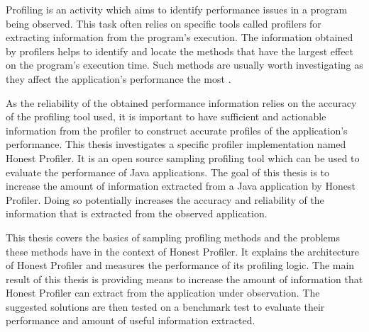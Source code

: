 \documentclass[..thesis.tex]{subfiles}
\begin{document}
Profiling is an activity which aims to identify performance issues in a program being observed. This task often relies on specific tools called profilers for extracting information from the program's execution. The information obtained by profilers helps to identify and locate the methods that have the largest effect on the program's execution time. Such methods are usually worth investigating as they affect the application's performance the most \cite{mytkowicz_evaluating_2010}.


As the reliability of the obtained performance information relies on the accuracy of the profiling tool used, it is important to have sufficient and actionable information from the profiler to construct accurate profiles of the application's performance. This thesis investigates a specific profiler implementation named Honest Profiler. It is an open source sampling profiling tool which can be used to evaluate the performance of Java applications. The goal of this thesis is to increase the amount of information extracted from a Java application by Honest Profiler. Doing so potentially increases the accuracy and reliability of the information that is extracted from the observed application. 

This thesis covers the basics of sampling profiling methods and the problems these methods have in the context of Honest Profiler. It explains the architecture of Honest Profiler and measures the performance of its profiling logic. The main result of this thesis is providing means to increase the amount of information that Honest Profiler can extract from the application under observation. The suggested solutions are then tested on a benchmark test to evaluate their performance and amount of useful information extracted.

\end{document}
